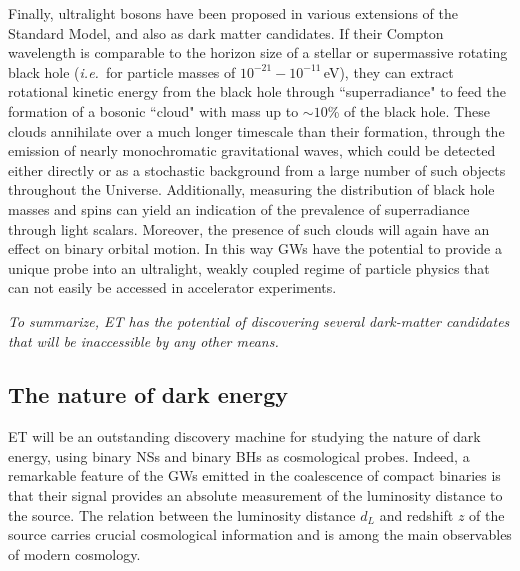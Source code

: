 Finally, ultralight bosons have been proposed in various extensions of the Standard Model, and also as  dark matter candidates.
If their
Compton wavelength is comparable to the horizon size of a stellar or supermassive 
rotating black hole (\emph{i.e.}~for particle masses of $10^{-21} - 10^{-11}$\,eV),
they can extract rotational kinetic energy from the black hole through ``superradiance" to feed the formation of a bosonic ``cloud" with mass up to $\sim 10$\% of the black hole.
These clouds annihilate over a much longer timescale than their formation, through the emission of nearly monochromatic gravitational waves, which could be detected either directly or as a stochastic background from a large number of such objects throughout the Universe.
Additionally, measuring the distribution of black hole masses and spins can yield an indication of the prevalence of superradiance through light scalars. 
Moreover, the presence of such clouds will again have an effect on binary orbital motion.%
In this way GWs have the potential to provide a unique probe into 
an ultralight, weakly coupled regime of particle physics that can not easily be accessed in accelerator experiments.

\emph{To summarize, ET has the potential of discovering several dark-matter candidates that will be inaccessible by any other means.}

     
\subsection{The nature of dark energy}\label{sec:cosmos}

ET will be an outstanding discovery machine for studying the nature of dark energy, using binary NSs and binary BHs as cosmological probes.
Indeed, a remarkable feature of the GWs emitted in the coalescence of compact binaries is that  their signal   provides an absolute measurement of the luminosity distance to the source. The relation between the luminosity distance $d_L$ and redshift $z$ of the source carries crucial cosmological information and is among the main observables of modern cosmology. 

